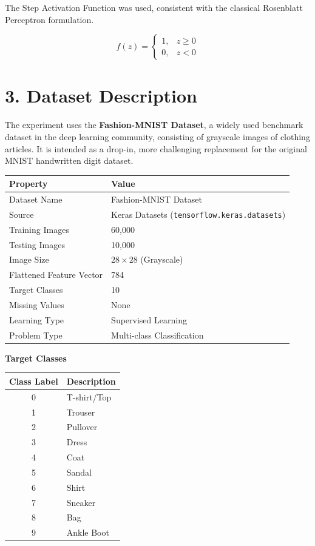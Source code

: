 \documentclass[11pt,a4paper]{article}
\begin{document}
The Step Activation Function was used, consistent with the classical Rosenblatt Perceptron formulation.

\[
f(z)=
\begin{cases}
1,&z\ge0\\
0,&z<0
\end{cases}
\]
\section*{3. Dataset Description}

The experiment uses the \textbf{Fashion-MNIST Dataset}, a widely used benchmark dataset in the deep learning community, consisting of grayscale images of clothing articles. It is intended as a drop-in, more challenging replacement for the original MNIST handwritten digit dataset.

\vspace{0.3cm}

\begin{center}
\begin{tabular}{|p{5cm}|p{7cm}|}
\hline
\textbf{Property} & \textbf{Value}\\
\hline
Dataset Name & Fashion-MNIST Dataset\\
\hline
Source & Keras Datasets (\texttt{tensorflow.keras.datasets})\\
\hline
Training Images & 60{,}000\\
\hline
Testing Images & 10{,}000\\
\hline
Image Size & $28 \times 28$ (Grayscale)\\
\hline
Flattened Feature Vector & 784\\
\hline
Target Classes & 10\\
\hline
Missing Values & None\\
\hline
Learning Type & Supervised Learning\\
\hline
Problem Type & Multi-class Classification\\
\hline
\end{tabular}
\end{center}

\vspace{0.15cm}
\newpage
\textbf{Target Classes}

\begin{center}
\begin{tabular}{|c|p{9cm}|}
\hline
\textbf{Class Label} & \textbf{Description}\\
\hline
0 & T-shirt/Top\\
\hline
1 & Trouser\\
\hline
2 & Pullover\\
\hline
3 & Dress\\
\hline
4 & Coat\\
\hline
5 & Sandal\\
\hline
6 & Shirt\\
\hline
7 & Sneaker\\
\hline
8 & Bag\\
\hline
9 & Ankle Boot\\
\hline
\end{tabular}
\end{center}
\end{document}
